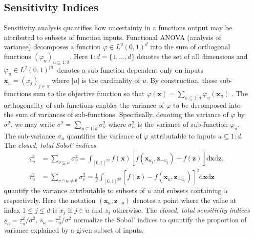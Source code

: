 \documentclass[graybox]{svmult}
\begin{document}
% 

\subsection{Sensitivity Indices}

Sensitivity analysis quantifies how uncertainty in a functions output may be attributed to subsets of function inputs. Functional ANOVA (analysis of variance) decomposes a function $\varphi \in L^2(0,1)^{d}$ into the sum of orthogonal functions $(\varphi_u)_{u \subseteq {1:d}}$. Here $1:d=\{1,\dots,d\}$ denotes the set of all dimensions and $\varphi_u \in L^2(0,1)^{\lvert u \rvert}$ denotes a sub-function dependent only on inputs $\boldsymbol{x}_u = (x_j)_{j \in u}$ where $\lvert u \rvert$ is the cardinality of $u$. By construction, these sub-functions sum to the objective function so that $\varphi(\boldsymbol{x}) = \sum_{u \subseteq 1:d} \varphi_u(\boldsymbol{x}_u)$ \cite[Appendix A]{mcbook}. The orthogonality of sub-functions enables the variance of $\varphi$ to be decomposed into the sum of variances of sub-functions. Specifically, denoting the variance of $\varphi$ by $\sigma^2$, we may write $\sigma^2 = \sum_{u \subseteq 1:d} \sigma^2_u$ where $\sigma^2_u$ is the variance of sub-function $\varphi_u$. The sub-variance $\sigma_u$ quantifies the variance of $\varphi$ attributable to inputs $u \subseteq 1:d$.  The \emph{closed, total Sobol' indices}
\begin{align*}
    \underline{\tau}_u^2 &= \sum_{v \subseteq u} \sigma^2_v = \int_{[0,1]^{2d}} f(\boldsymbol{x})[f(\boldsymbol{x}_{u_j},\boldsymbol{z}_{-{u_j}})-f(\boldsymbol{z})]\mathrm{d}\boldsymbol{x}\mathrm{d}\boldsymbol{z}, \\ 
    \overline{\tau}_u^2 &= \sum_{v \cap u \neq \emptyset} \sigma^2_v = \frac{1}{2}\int_{[0,1]^{2d}} [f(\boldsymbol{z})-f(\boldsymbol{x}_u,\boldsymbol{z}_{-{u_j}})]^2\mathrm{d}\boldsymbol{x}\mathrm{d}\boldsymbol{z}
    \label{SoRa_eq:sobol_indices}
\end{align*}
quantify the variance attributable to subsets of $u$ and subsets containing $u$ respectively. Here the notation $(\boldsymbol{x}_{u},\boldsymbol{z}_{-u})$ denotes a point where the value at index $1 \leq j \leq d$ is $x_j$ if $j \in u$ and $z_j$ otherwise. The \emph{closed, total sensitivity indices} $\underline{s}_u = \underline{\tau}_u^2/\sigma^2$, $\overline{s}_u = \overline{\tau}_u^2/\sigma^2$ normalize the Sobol' indices to quantify the proportion of variance explained by a given subset of inputs. 
\end{document}
